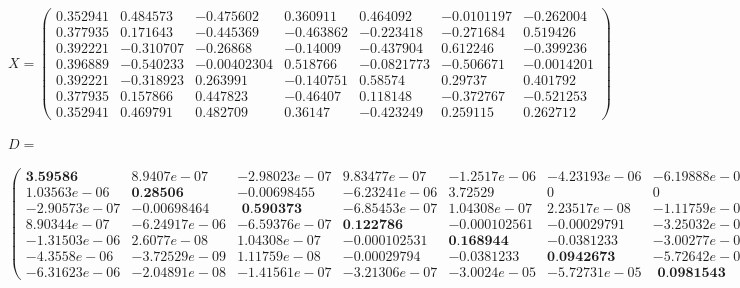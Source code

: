 \begin{equation*}
X = 
\begin{pmatrix}
0.352941    &    0.484573   &    -0.475602  &      0.360911    &    0.464092     & -0.0101197   &    -0.262004 \\
0.377935      &  0.171643    &   -0.445369   &    -0.463862     &  -0.223418   &    -0.271684      &  0.519426 \\
0.392221     &  -0.310707     &   -0.26868    &    -0.14009   &    -0.437904    &    0.612246     &  -0.399236 \\
0.396889      & -0.540233    & -0.00402304     &   0.518766    &  -0.0821773     &  -0.506671    &  -0.0014201 \\
0.392221     &  -0.318923     &   0.263991      & -0.140751     &    0.58574      &   0.29737      &  0.401792 \\
0.377935     &   0.157866      &  0.447823      &  -0.46407      &  0.118148      & -0.372767    &   -0.521253 \\
0.352941      &  0.469791       & 0.482709      &   0.36147   &    -0.423249   &     0.259115      &  0.262712
\end{pmatrix}
\end{equation*}

\begin{center}
$ D = $
\end{center}
\begin{equation*}
\begin{pmatrix}
\textbf{3.59586}    &  8.9407e-07  &  -2.98023e-07  &   9.83477e-07  &   -1.2517e-06   & -4.23193e-06  &  -6.19888e-06 \\ 
1.03563e-06   &      \textbf{0.28506}  &   -0.00698455 &   -6.23241e-06 &    3.72529   &          0             &  0 \\ 
-2.90573e-07   &  -0.00698464  &     \textbf{ 0.590373} &   -6.85453e-07 &    1.04308e-07    & 2.23517e-08   & -1.11759e-07 \\
8.90344e-07  &  -6.24917e-06    &-6.59376e-07   &     \textbf{0.122786}   & -0.000102561    & -0.00029791  &  -3.25032e-07 \\
-1.31503e-06  &    2.6077e-08    & 1.04308e-07   & -0.000102531   &     \textbf{0.168944}     & -0.0381233  &  -3.00277e-05  \\
-4.3558e-06  &  -3.72529e-09    & 1.11759e-08     &-0.00029794     & -0.0381233   &    \textbf{0.0942673}   & -5.72642e-05 \\
-6.31623e-06  &  -2.04891e-08   & -1.41561e-07    &-3.21306e-07    & -3.0024e-05   & -5.72731e-05   &   \textbf{ 0.0981543 }
\end{pmatrix}
\end{equation*}
\newpage

